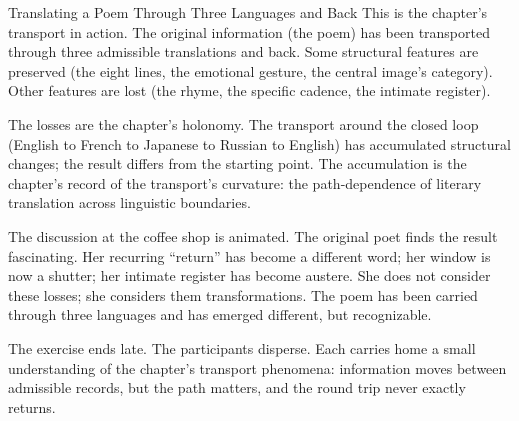 \begin{coda}{Translating a Poem Through Three Languages and Back}
This is the chapter's transport in action. The original
information (the poem) has been transported through three
admissible translations and back. Some structural features are
preserved (the eight lines, the emotional gesture, the central
image's category). Other features are lost (the rhyme, the
specific cadence, the intimate register).

The losses are the chapter's holonomy. The transport around the
closed loop (English to French to Japanese to Russian to
English) has accumulated structural changes; the result differs
from the starting point. The accumulation is the chapter's
record of the transport's curvature: the path-dependence of
literary translation across linguistic boundaries.

The discussion at the coffee shop is animated. The original poet
finds the result fascinating. Her recurring ``return'' has
become a different word; her window is now a shutter; her
intimate register has become austere. She does not consider
these losses; she considers them transformations. The poem has
been carried through three languages and has emerged different,
but recognizable.

The exercise ends late. The participants disperse. Each carries
home a small understanding of the chapter's transport
phenomena: information moves between admissible records, but
the path matters, and the round trip never exactly returns.

\end{coda}

